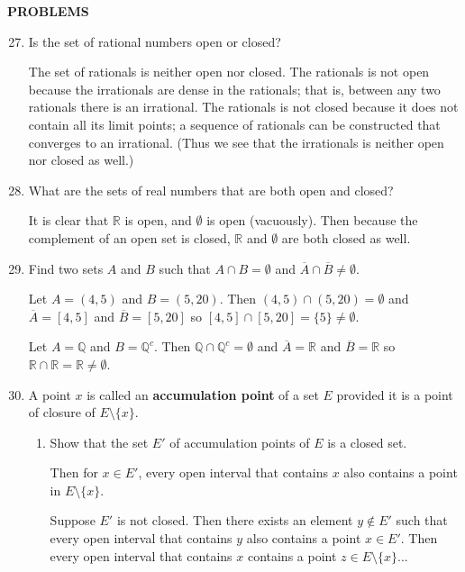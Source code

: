 \begin{center}
	\textbf{PROBLEMS}
\end{center}
\begin{enumerate}
	\setcounter{enumi}{26}
	\item Is the set of rational numbers open or closed?\par
	The set of rationals is neither open nor closed.
	The rationals is not open because the irrationals are dense in the rationals; that is, between any two rationals there is an irrational.
	The rationals is not closed because it does not contain all its limit points; a sequence of rationals can be constructed that converges to an irrational.
	(Thus we see that the irrationals is neither open nor closed as well.)
	\item What are the sets of real numbers that are both open and closed?\par
	It is clear that $\mathbb{R}$ is open, and $\emptyset$ is open (vacuously).
	Then because the complement of an open set is closed, $\mathbb{R}$ and $\emptyset$ are both closed as well.
	\item Find two sets $A$ and $B$ such that $A \cap B = \emptyset$ and $\overline A \cap \overline B \neq \emptyset.$\par
	Let $A= (4,5)$ and $B = (5,20)$. Then $(4,5) \cap (5,20) = \emptyset$ and $\overline A= [4,5]$ and $\overline B = [5,20]$ so $[4,5] \cap [5,20]= \{5\} \neq \emptyset$.\par
	Let $A= \mathbb{Q}$ and $B = \mathbb{Q}^c$. Then $\mathbb{Q} \cap \mathbb{Q}^c = \emptyset$ and $\overline A= \mathbb{R}$ and $\overline B = \mathbb{R}$ so $\mathbb{R} \cap \mathbb{R}= \mathbb{R} \neq \emptyset$.\par
	\item A point $x$ is called an \textbf{accumulation point} of a set $E$ provided it is a point of closure of $E \setminus \{ x\}.$
	\begin{enumerate}[label=(\roman*),align=left]
        \item Show that the set $E'$ of accumulation points of $E$ is a closed set.\par
        Then for $x \in E'$, every open interval that contains $x$ also contains a point in $E \setminus \{x\}$.\par
		Suppose $E'$ is not closed. 
		Then there exists an element $y \notin E'$ such that every open interval that contains $y$ also contains a point $x \in E'$.
		Then every open interval that contains $x$ contains a point $z \in E \setminus \{x\}$... 

\end{enumerate}
\end{enumerate}
